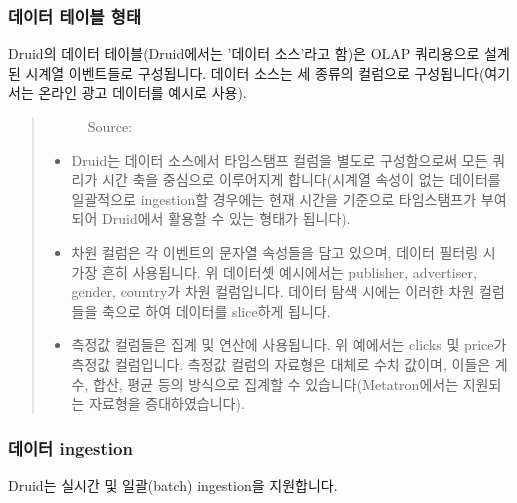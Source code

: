 \documentclass[letterpaper,10pt,english]{sphinxmanual}
\begin{document}
\subsubsection{데이터 테이블 형태}
\label{\detokenize{discovery/part01/druid_features:id1}}
Druid의 데이터 테이블(Druid에서는 '데이터 소스'라고 함)은 OLAP 쿼리용으로 설계된 시계열 이벤트들로 구성됩니다. 데이터 소스는 세 종류의 컬럼으로 구성됩니다(여기서는 온라인 광고 데이터를 예시로 사용).
\begin{quote}

\begin{figure}[H]
\centering
\capstart

\noindent{}
\caption{Source: }\label{\detokenize{discovery/part01/druid_features:id6}}\end{figure}
\begin{itemize}
\item {} 
 Druid는 데이터 소스에서 타임스탬프 컬럼을 별도로 구성함으로써 모든 쿼리가 시간 축을 중심으로 이루어지게 합니다(시계열 속성이 없는 데이터를 일괄적으로 ingestion할 경우에는 현재 시간을 기준으로 타임스탬프가 부여되어 Druid에서 활용할 수 있는 형태가 됩니다).

\item {} 
 차원 컬럼은 각 이벤트의 문자열 속성들을 담고 있으며, 데이터 필터링 시 가장 흔히 사용됩니다. 위 데이터셋 예시에서는 publisher, advertiser, gender, country가 차원 컬럼입니다. 데이터 탐색 시에는 이러한 차원 컬럼들을 축으로 하여 데이터를 slice하게 됩니다.

\item {} 
 측정값 컬럼들은 집계 및 연산에 사용됩니다. 위 예에서는 clicks 및 price가 측정값 컬럼입니다. 측정값 컬럼의 자료형은 대체로 수치 값이며, 이들은 계수, 합산, 평균 등의 방식으로 집계할 수 있습니다(Metatron에서는 지원되는 자료형을 증대하였습니다).

\end{itemize}
\end{quote}


\subsubsection{데이터 ingestion}
\label{\detokenize{discovery/part01/druid_features:ingestion}}
Druid는 실시간 및 일괄(batch) ingestion을 지원합니다.
\end{document}
